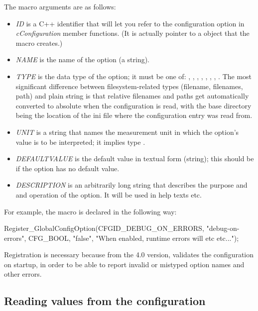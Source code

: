 The macro arguments are as follows:
\begin{itemize}
  \item \textit{ID} is a C++ identifier that will let you refer to
        the configuration option in \textit{cConfiguration} member functions.
        (It is actually pointer to a  object that
        the macro creates.)
  \item \textit{NAME} is the name of the option (a string).
  \item \textit{TYPE} is the data type of the option; it must be one of:
        , , , ,
        , , , .
        The most significant difference between filesystem-related types
        (filename, filenames, path) and plain string is that relative
        filenames and paths get automatically converted to absolute
        when the configuration is read, with the base directory being the
        location of the ini file where the configuration entry was read from.
  \item \textit{UNIT} is a string that names the measurement unit in which
        the option's value is to be interpreted; it implies type .
  \item \textit{DEFAULTVALUE} is the default value in textual form (string);
        this should be  if the option has no default value.
  \item \textit{DESCRIPTION} is an arbitrarily long string that describes
        the purpose and and operation of the option. It will be used in
        help texts etc.
\end{itemize}

For example, the  macro is declared in the following way:

\begin{cpp}
Register_GlobalConfigOption(CFGID_DEBUG_ON_ERRORS,
                            "debug-on-errors", CFG_BOOL, "false",
                            "When enabled, runtime errors will etc etc...");
\end{cpp}

\begin{note}
Registration is necessary because from the 4.0 version, {\opp} validates
the configuration on startup, in order to be able to report invalid or
mistyped option names and other errors.
\end{note}


\subsection{Reading values from the configuration}

